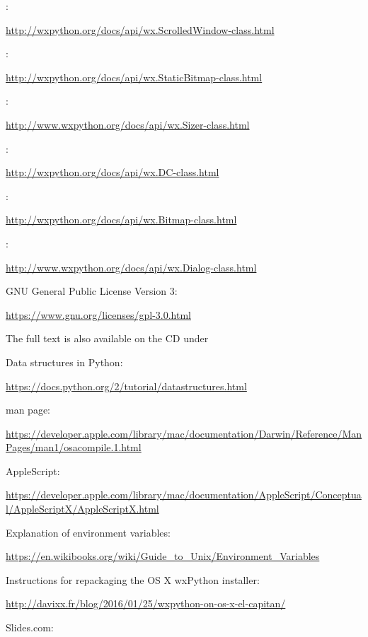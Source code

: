 \documentclass[12pt,a4paper,naustrian,english,oneside,openright,DIV=12,BCOR=1cm]{scrbook}
\begin{document}
\begin{thebibliography}{999}
	 :
	
	\url{http://wxpython.org/docs/api/wx.ScrolledWindow-class.html}
	
	 :
	
	\url{http://wxpython.org/docs/api/wx.StaticBitmap-class.html}
	
	 :
	
	\url{http://www.wxpython.org/docs/api/wx.Sizer-class.html}
	
	 :
	
	\url{http://wxpython.org/docs/api/wx.DC-class.html}
	
	 :
	
	\url{http://wxpython.org/docs/api/wx.Bitmap-class.html}
	
	 :
	
	\url{http://www.wxpython.org/docs/api/wx.Dialog-class.html}
	
	 GNU General Public License Version 3:
	
	\url{https://www.gnu.org/licenses/gpl-3.0.html}
	
	
	The full text is also available on the CD under 
	
	 Data structures in Python:
	
	\url{https://docs.python.org/2/tutorial/datastructures.html}
	
	  man page:
	
	\url{https://developer.apple.com/library/mac/documentation/Darwin/Reference/ManPages/man1/osacompile.1.html}
	
	 AppleScript: 
	
	\url{https://developer.apple.com/library/mac/documentation/AppleScript/Conceptual/AppleScriptX/AppleScriptX.html}
	
	 Explanation of environment variables:  
	
	\url{https://en.wikibooks.org/wiki/Guide_to_Unix/Environment_Variables}
	
	 Instructions for repackaging the OS X wxPython installer:
	
	\url{http://davixx.fr/blog/2016/01/25/wxpython-on-os-x-el-capitan/}
	
	 Slides.com:
	

\end{thebibliography}
\end{document}
